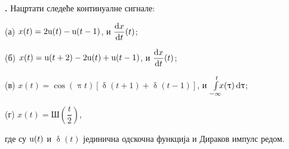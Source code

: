 \noindent
\textbf{\ID.}
Нацртати следеће 
континуалне сигнале:\\
\begin{minipage}[c]{0.499\textwidth}
(а) $x(t) = 
2{\rm u}(t) - {\rm u}(t-1) 
$, и $\dfrac{{\rm d} x}{{\rm d} t}(t)$;

(б) $x(t) = {\rm u}(t+2) - 2{\rm u}(t) + {\rm u}(t-1)$,
и $\dfrac{{\rm d} x}{{\rm d} t}(t)$;
\end{minipage}
%
\begin{minipage}[c]{0.499\textwidth}
(в) 
$
x(t) = \cos(\uppi t)[\updelta(t + 1) 
+ \updelta(t-1)]
$, и $\int\limits_{-\infty}^t \hspace*{-0.5em}
x(\uptau)\, {\rm d}\uptau$;

(г) $x(t) = 
\text{Ш}\left(\dfrac t2\right)$,
\end{minipage}
\noindent
где су ${\rm u}(t)$ и $\updelta(t)$ јединична одскочна функција 
и Дираков импулс редом. \\

